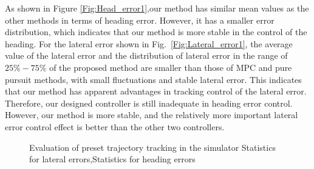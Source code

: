 \documentclass[sn-mathphys]{sn-jnl}%
\theoremstyle{thmstyleone}%
\theoremstyle{thmstyletwo}%
\theoremstyle{thmstylethree}%
\begin{document}
As shown in Figure \ref{Fig:Head_error1},our method has similar mean values as the other methods in terms of heading error. However, it has a smaller error distribution, which indicates that our method is more stable in the control of the heading. For the lateral error shown in Fig.~\ref{Fig:Lateral_error1}, the average value of the lateral error and the  distribution of lateral error in the range of $25\%-75\%$ of the proposed method are smaller than those of MPC and pure pursuit methods, with small fluctuations and stable lateral error. This indicates that our method has apparent advantages in tracking control of the lateral error.
Therefore, our designed controller is still inadequate in heading error control. However, our method is more stable, and the relatively more important lateral error control effect is better than the other two controllers.
\begin{figure}[!htbp]
	\centering
	\quad
	
	\caption{Evaluation of preset trajectory tracking in the simulator \protect{} Statistics for lateral errors,\protect{}Statistics for heading errors}
	\label{Fig:Statistics1}
\end{figure}
\end{document}
